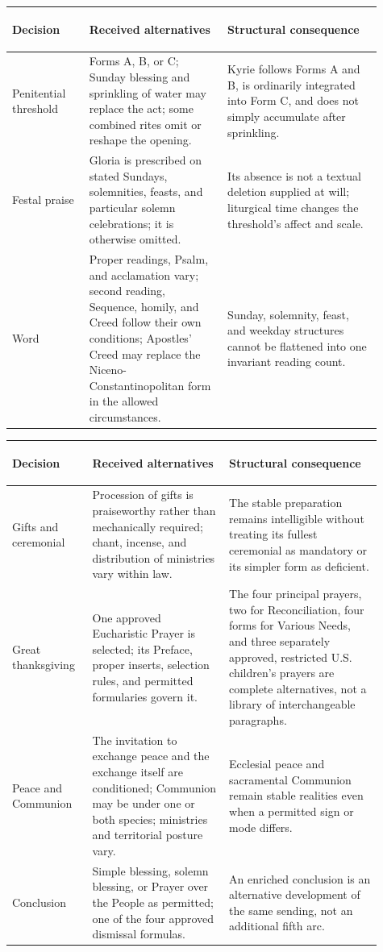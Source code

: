 \noindent\begin{tabular}{>{\bfseries\raggedright\arraybackslash}p{0.19\linewidth}>{\raggedright\arraybackslash}p{0.34\linewidth}>{\raggedright\arraybackslash}p{0.38\linewidth}}
Decision & Received alternatives & Structural consequence\\
\midrule
Penitential threshold & Forms A, B, or C; Sunday blessing and sprinkling of water may replace the act; some combined rites omit or reshape the opening. & Kyrie follows Forms A and B, is ordinarily integrated into Form C, and does not simply accumulate after sprinkling.\\
Festal praise & Gloria is prescribed on stated Sundays, solemnities, feasts, and particular solemn celebrations; it is otherwise omitted. & Its absence is not a textual deletion supplied at will; liturgical time changes the threshold's affect and scale.\\
Word & Proper readings, Psalm, and acclamation vary; second reading, Sequence, homily, and Creed follow their own conditions; Apostles' Creed may replace the Niceno-Constantinopolitan form in the allowed circumstances. & Sunday, solemnity, feast, and weekday structures cannot be flattened into one invariant reading count.\\
\bottomrule
\end{tabular}

\smallskip
\noindent\begin{tabular}{>{\bfseries\raggedright\arraybackslash}p{0.19\linewidth}>{\raggedright\arraybackslash}p{0.34\linewidth}>{\raggedright\arraybackslash}p{0.38\linewidth}}
\toprule
Decision & Received alternatives & Structural consequence\\
\midrule
Gifts and ceremonial & Procession of gifts is praiseworthy rather than mechanically required; chant, incense, and distribution of ministries vary within law. & The stable preparation remains intelligible without treating its fullest ceremonial as mandatory or its simpler form as deficient.\\
Great thanksgiving & One approved Eucharistic Prayer is selected; its Preface, proper inserts, selection rules, and permitted formularies govern it. & The four principal prayers, two for Reconciliation, four forms for Various Needs, and three separately approved, restricted U.S. children's prayers are complete alternatives, not a library of interchangeable paragraphs.\\
Peace and Communion & The invitation to exchange peace and the exchange itself are conditioned; Communion may be under one or both species; ministries and territorial posture vary. & Ecclesial peace and sacramental Communion remain stable realities even when a permitted sign or mode differs.\\
Conclusion & Simple blessing, solemn blessing, or Prayer over the People as permitted; one of the four approved dismissal formulas. & An enriched conclusion is an alternative development of the same sending, not an additional fifth arc.\\
\end{tabular}

